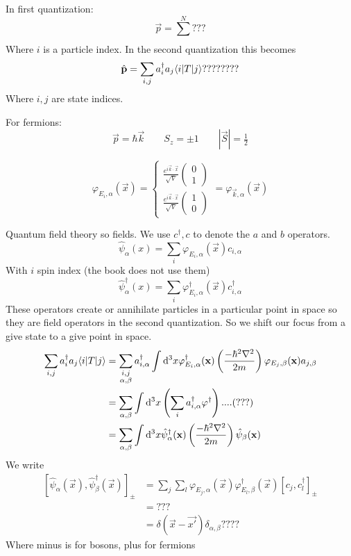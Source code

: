 In first quantization:
\[ \vec{p} = \sum^N_{}  ???\]
Where $i$ is a particle index.
In the second quantization this becomes
\[ \hat{\vec{p}} =  \sum_{i,j}a_i^\dagger a_j \braket[T]{i}{j} ????????\]
Where $i,j$ are state indices.

For fermions:
\[ \vec{p} = \hbar \vec{k} \qquad S_z = \pm 1 \qquad |\vec{S}| = \tfrac{1}{2} \]

\[ \varphi_{E_i, \alpha}(\vec{x}) = \begin{cases}
\frac{e^{i \vec{k}\cdot \vec{x}}}{\sqrt{V}}\begin{pmatrix}
0\\1
\end{pmatrix} \\
\frac{e^{i \vec{k}\cdot \vec{x}}}{\sqrt{V}}\begin{pmatrix}
1\\0
\end{pmatrix}
\end{cases} = \varphi_{\vec{k}, \alpha}(\vec{x}) \]

Quantum field theory so fields. We use $c^\dagger, c$ to denote the $a$ and $b$ operators.
\[ \hat{\psi}_\alpha(x) = \sum_i \varphi_{E_i,\alpha}(\vec{x})c_{i,\alpha} \]
With $i$ spin index (the book does not use them)
\[ \hat{\psi}^\dagger_\alpha(x) = \sum_i \varphi^\dagger_{E_i,\alpha}(\vec{x})c^\dagger_{i,\alpha} \]
These operators create or annihilate particles in a particular point in space so they are field operators in the second quantization. So we shift our focus from a give state to a give point in space.
\begin{align*} \sum_{i,j} a_i^\dagger a_j \braket[T]{i}{j} &= \sum_{\substack{i,j\\\alpha, \beta}} a^\dagger_{i,\alpha} \int \diff{^3x}\varphi^\dagger_{E_i,\alpha}(\vec{x})\left(\frac{-\hbar^2\nabla^2}{2m}\right)\varphi_{E_j,\beta}(\vec{x}) a_{j,\beta} \\
&= \sum_{\alpha, \beta} \int \diff{^3x}\left(\sum_i a_{i,\alpha}^\dagger\varphi^\dagger\right) ....(???) \\
&= \sum_{\alpha, \beta} \int \diff{^3x}\hat{\psi}^\dagger_\alpha(\vec{x})\left(\frac{-\hbar^2\nabla^2}{2m}\right)\hat{\psi}_\beta(\vec{x})
\end{align*}
We write
\begin{align*}
\left[\hat{\psi}_\alpha(\vec{x}), \hat{\psi}^\dagger_\beta(\vec{x})\right]_{\pm} &= \sum_j\sum_l \varphi_{E_j,\alpha}(\vec{x})\varphi^\dagger_{E_l,\beta}(\vec{x})\left[c_j,c_l^\dagger\right]_{\pm} \\
&= ??? \\
&= \delta(\vec{x} - \vec{x'})\delta_{\alpha,\beta} ????
\end{align*}
Where minus is for bosons, plus for fermions


